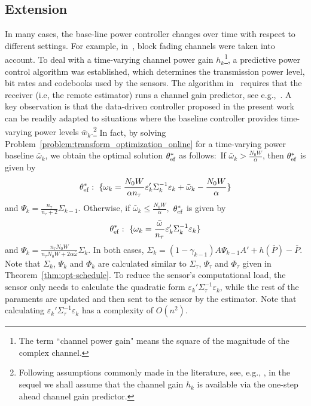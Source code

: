 \documentclass[twocolumn]{autart}    \usepackage{cite}
\begin{document}
{{\subsection{Extension }\label{subsec:vary-power-in-time}
 In many
cases, the base-line power controller
changes over time with
respect to different
settings. For example, in~\cite{queahl10}, block fading channels were taken
into account. To deal with a time-varying channel power gain $h_k$\footnote{
The term ``channel power gain" means the square of the magnitude of the complex channel.}, a predictive power control algorithm
was established, which
determines the transmission power level, bit rates and
codebooks used by the sensors.
{
The algorithm in~\cite{queahl10} requires
that the receiver (i.e, the remote estimator) runs a channel gain predictor, see e.g.,~\cite{linahl02}.}
{A key observation is that the data-driven controller proposed in the present work can be readily adapted to situations where the baseline controller provides time-varying power levels $\bar{w}_k$.\footnote{{ Following assumptions commonly made in the literature, see, e.g., \cite{queahl10,quevedo2012kalman}, in the sequel we shall assume that the channel gain $h_k$ is available via the one-step ahead channel gain predictor.}}}
In fact, by solving Problem~\ref{problem:transform_optimization_online}
for a time-varying power
baseline $\bar \omega_k$, we obtain the optimal
solution $\theta_{\rm ef}^*$ as
follows:~If $\bar\omega_k>\frac{N_0W}{\alpha}$, then $\theta_{\rm ef}^*$
is given by
$$\theta_{\rm ef}^*:~\{\omega_k
=\frac{N_0W}{\alpha n_\tau}
\varepsilon_k'\Sigma_k^{-1}\varepsilon_k
+\bar \omega_k-\frac{N_0W}{\alpha}\}$$
and
$\Psi_{k}=\frac{n_\tau}{n_\tau+2}
\Sigma_{k-1}$.
Otherwise, if $\bar \omega_k\leq \frac{N_0W}{\alpha},$
$\theta_{\rm ef}^*$ is given by
$$\theta_{\rm ef}^*:~\{\omega_k
=\frac{\bar \omega}{n_\tau}
\varepsilon_k'\Sigma_k^{-1}\varepsilon_k
\}$$
and $\Psi_{k}=
\frac{n_\tau N_0W}{n_\tau N_0W+2\alpha
\bar \omega}
\Sigma_{k}.$ In both cases, $\Sigma_k=(1-\gamma_{k-1})A\Psi_{k-1}A'+
h(\overline{P})-\overline{P}$.
Note that $\Sigma_k$, $\Psi_k$ and $\Phi_k$ are calculated similar to $\Sigma_\tau$,
$\Psi_\tau$ and $\Phi_\tau$ given in Theorem~\ref{thm:opt-schedule}.
To reduce the sensor's computational load, the sensor only needs to
calculate the quadratic form $\varepsilon_k'\Sigma_\tau^{-1}\varepsilon_k$,
while the rest of the paraments are updated and then sent to the sensor by the estimator.
Note that calculating $\varepsilon_k'\Sigma_\tau^{-1}\varepsilon_k$
has a complexity of $O(n^2)$.}






}
\end{document}
